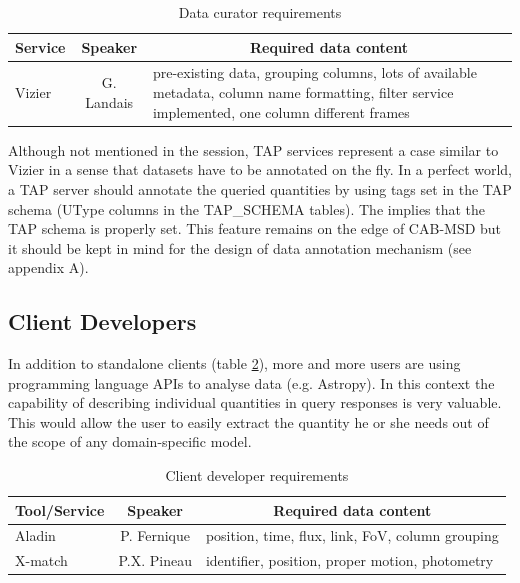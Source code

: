 \documentclass[11pt,a4paper]{ivoa}
\begin{document}
\begin{table}
\begin{tabular}{|p{7em}|c|p{17em}|}
  \hline
    \multicolumn{1}{|c}{\bfseries Service} & \multicolumn{1}{|c}{\bfseries Speaker} & \multicolumn{1}{|c|}{\bfseries Required data content}
    \\
  \hline
  Vizier & G. Landais & 
pre-existing data, grouping columns, lots of available metadata, column name formatting, filter service implemented, one column different frames
\\
\hline
\end{tabular}
\caption{Data curator requirements}
\label{table:tcurator}
\end{table}

Although not mentioned in the session, TAP services represent a case similar to Vizier in a sense that datasets have to be annotated on the fly. In a perfect world, a TAP server should annotate the queried quantities by using tags set in the TAP schema (UType columns in the TAP\_SCHEMA tables). The implies that the TAP schema is properly set. This feature remains on the edge of CAB-MSD but it should be kept in mind for the design of data annotation mechanism (see appendix A).     

\subsection{Client Developers}
In addition to standalone clients (table \ref{table:tclient}), more and more users are using programming language APIs to analyse data (e.g. Astropy). In this context the capability of describing individual quantities in query responses is very valuable. This would allow the user to easily extract the quantity he or she needs out of the scope of any domain-specific model.
\begin{table}[H]
\begin{tabular}{|p{7em}|c|p{17em}|}
  \hline
      \multicolumn{1}{|c}{\bfseries Tool/Service} & \multicolumn{1}{|c}{\bfseries Speaker} & \multicolumn{1}{|c|}{\bfseries Required data content}\\
  \hline
  Aladin & P. Fernique & 
position, time, flux, link, FoV, column grouping
 \\
  X-match & P.X. Pineau & 
identifier, position, proper motion, photometry
 \\
 \hline

\end{tabular}
\caption{Client developer requirements}
\label{table:tclient}
\end{table}
\end{document}

